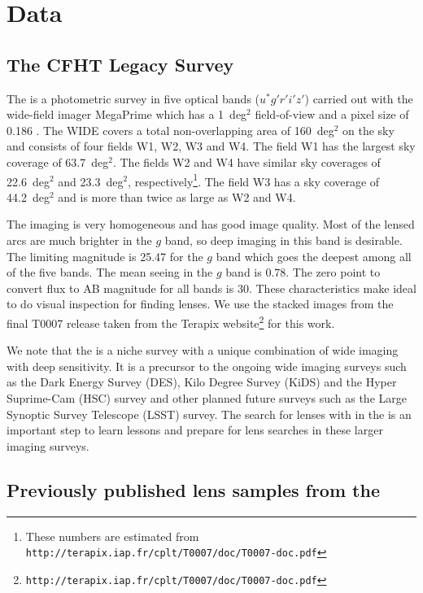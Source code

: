 \documentclass[useAMS,usenatbib,a4paper]{mn2e}
\begin{document}
\section{Data}
\label{sec:data}

\subsection{The CFHT Legacy Survey}
\label{sec:data:cfhtls}

The \cfhtls is a photometric survey in five optical bands
($u^*g'r'i'z'$) carried out with the wide-field imager MegaPrime which
has a 1~deg$^2$ field-of-view and a pixel size of 0.186\arcsec
\citep{Gwyn2012}. The \cfhtls WIDE covers a total
non-overlapping area of 160~deg$^2$ on the sky and consists of four
fields W1, W2, W3 and W4. The field W1 has the largest sky coverage of
63.7~deg$^2$. The fields W2 and W4 have similar sky coverages of
22.6~deg$^2$ and 23.3~deg$^2$, respectively\footnote{These numbers are
estimated from
\texttt{http://terapix.iap.fr/cplt/T0007/doc/T0007-doc.pdf}}.  The field
W3 has a sky coverage of 44.2~deg$^2$ and is more than twice as large as
W2 and W4.

The \cfhtls imaging is very homogeneous and has good image quality. Most
of the lensed arcs are much brighter in the $g$ band, so deep imaging
in this band is desirable. The limiting magnitude is 25.47 for the $g$
band which goes the deepest among all of the five bands. The mean seeing
in the $g$ band is 0.78\arcsec. The zero point to convert flux to AB
magnitude for all bands is 30. These characteristics make \cfhtls ideal
to do visual inspection for finding lenses.  We use the stacked images
from the final T0007 release taken from the Terapix
website\footnote{\texttt{http://terapix.iap.fr/cplt/T0007/doc/T0007-doc.pdf}}
for this work.

We note that the \cfhtls is a niche survey with a unique combination of wide
imaging with deep sensitivity. It is a precursor to the ongoing wide imaging
surveys such as the Dark Energy Survey (DES), Kilo Degree Survey (KiDS) and the
Hyper Suprime-Cam (HSC) survey and other planned future surveys such as the
Large Synoptic Survey Telescope (LSST) survey.  The search for lenses with \sw
in the \cfhtls is an important step to learn lessons and prepare for lens
searches in these larger imaging surveys.



\subsection{Previously published lens samples from the \cfhtls}
\label{sec:data:kls}
\end{document}

